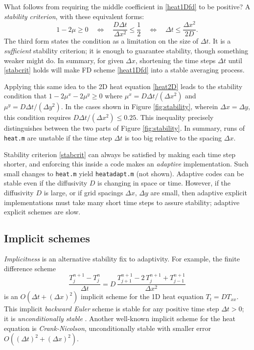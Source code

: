 \documentclass[letterpaper,final,12pt,reqno]{amsart}
\begin{document}
What follows from requiring the middle coefficient in \eqref{heat1Dfd} to be positive?  A \emph{stability criterion}, with these equivalent forms:
\begin{equation}
   1 - 2 \mu \ge 0 \quad \iff \quad \frac{D\Delta t}{\Delta x^2} \le \frac{1}{2} \quad \iff \quad \Delta t \le \frac{\Delta x^2}{2 D}.  \label{stabcrit}
\end{equation}
The third form states the condition as a limitation on the size of $\Delta t$.  It is a \emph{sufficient} stability criterion; it is enough to guarantee stability, though something weaker might do.  In summary, for given $\Delta x$, shortening the time steps $\Delta t$ until \eqref{stabcrit} holds will make FD scheme \eqref{heat1Dfd} into a stable averaging process.

Applying this same idea to the 2D heat equation \eqref{heat2D} leads to the stability condition that $1-2\mu^x-2\mu^y \ge 0$ where $\mu^x = D \Delta t / (\Delta x^2)$ and $\mu^y = D \Delta t / (\Delta y^2)$.  In the cases shown in Figure \ref{fig:stability}, wherein $\Delta x=\Delta y$, this condition requires $D \Delta t /(\Delta x^2) \le 0.25$.  This inequality precisely distinguishes between the two parts of Figure \ref{fig:stability}.  In summary, runs of \texttt{heat.m} are unstable if the time step $\Delta t$ is too big relative to the spacing $\Delta x$.

Stability criterion \eqref{stabcrit} can always be satisfied by making each time step shorter, and enforcing this inside a code makes an \emph{adaptive} implementation.  Such small changes to \texttt{heat.m} yield \texttt{heatadapt.m} (not shown).  Adaptive codes can be stable even if the diffusivity $D$ is changing in space or time.  However, if the diffusivity $D$ is large, or if grid spacings $\Delta x$, $\Delta y$ are small, then adaptive explicit implementations must take many short time steps to assure stability; adaptive explicit schemes are slow.

\subsection*{Implicit schemes}  \emph{Implicitness} is an alternative stability fix to adaptivity.  For example, the finite difference scheme
\begin{equation}
  \frac{T_j^{n+1} - T_j^n}{\Delta t} = D\,\frac{T_{j+1}^{n+1} - 2\, T_j^{n+1} + T_{j-1}^{n+1}}{\Delta x^2} \label{implicit1D}
\end{equation}
is an $O(\Delta t + (\Delta x)^2)$ implicit scheme for the 1D heat equation $T_t = D T_{xx}$.  This implicit \emph{backward Euler} scheme is stable for any positive time step $\Delta t>0$; it is \emph{unconditionally stable} \cite{LeVequeFD,MortonMayers}.  Another well-known implicit scheme for the heat equation is \emph{Crank-Nicolson}, unconditionally stable with smaller error $O((\Delta t)^2 +(\Delta x)^2)$.
\end{document}
